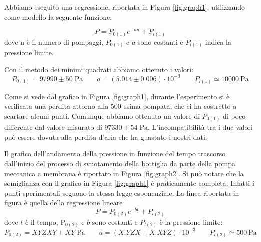 Abbiamo eseguito una regressione, riportata in Figura \ref{fig:graph1}, utilizzando come modello la seguente funzione:

\begin{equation}
    P = P_{0(1)} e^{-an} + P_{l(1)}
\end{equation}
%
dove n è il numero di pompaggi, $P_{0(1)}$ e $a$ sono costanti e $P_{l(1)}$ indica la pressione limite.

Con il metodo dei minimi quadrati abbiamo ottenuto i valori:
\begin{equation}
    P_{0(1)} = 97990 \pm 50 \; \si{\Pa} \qquad a = (5.014 \pm 0.006) \cdot 10^{-3} \qquad P_{l(1)} \simeq \SI{10000}{\Pa}
\end{equation}

Come si vede dal grafico in Figura \ref{fig:graph1},
durante l'esperimento si è verificata una perdita attorno alla 500-esima pompata, che ci ha costretto a scartare alcuni punti.
Comunque abbiamo ottenuto un valore di $P_{0(1)}$ %
di poco differente dal valore misurato di $97330 \pm 54 \; \si{\Pa}$.
L'incompatibilità tra i due valori può essere dovuta alla perdita d'aria che ha guastato i nostri dati.

Il grafico dell'andamento della pressione in funzione del tempo trascorso dall'inizio del processo di svuotamento della bottiglia da parte della pompa meccanica a membrana è riportato in Figura \ref{fig:graph2}. Si può notare che la somiglianza con il grafico in Figura \ref{fig:graph1} è praticamente completa. Infatti i punti sperimentali seguono la stessa legge esponenziale. La linea riportata in figura è quella della regressione lineare
\begin{equation}
    P = P_{0(2)} e^{-bt} + P_{l(2)}
\end{equation}
dove $t$ è il tempo, P$_{0(2)}$ e $b$ sono costanti e $P_{l(2)}$ è la pressione limite:
\begin{equation}
    P_{0(2)} = XYZXY \pm XY \; \si{\Pa} \qquad a = (X.YZX \pm X.XYZ) \cdot 10^{-3} \qquad P_{l(2)} \simeq \SI{500}{\Pa}
\end{equation}